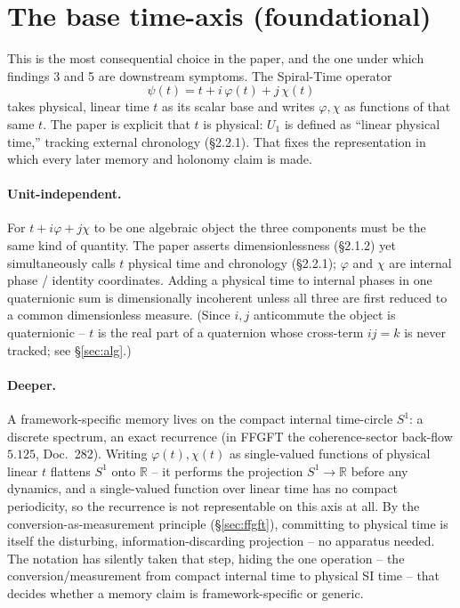 \section{The base time-axis (foundational)}
This is the most consequential choice in the paper, and the one under which findings 3
and 5 are downstream symptoms. The Spiral-Time operator
\begin{equation}
\psi(t) = t + i\,\varphi(t) + j\,\chi(t)
\end{equation}
takes physical, linear time $t$ as its scalar base and writes $\varphi,\chi$ as
functions of that same $t$. The paper is explicit that $t$ is physical: $U_1$ is defined
as ``linear physical time,'' tracking external chronology (\S2.2.1). That fixes the
representation in which every later memory and holonomy claim is made.

\paragraph{Unit-independent.} For $t + i\varphi + j\chi$ to be one algebraic object the
three components must be the same kind of quantity. The paper asserts dimensionlessness
(\S2.1.2) yet simultaneously calls $t$ physical time and chronology (\S2.2.1); $\varphi$
and $\chi$ are internal phase / identity coordinates. Adding a physical time to internal
phases in one quaternionic sum is dimensionally incoherent unless all three are first
reduced to a common dimensionless measure. (Since $i,j$ anticommute the object is
quaternionic -- $t$ is the real part of a quaternion whose cross-term $ij=k$ is never
tracked; see \S\ref{sec:alg}.)

\paragraph{Deeper.} A framework-specific memory lives on the compact internal time-circle
$S^1$: a discrete spectrum, an exact recurrence (in FFGFT the coherence-sector back-flow
$5.125$, Doc.~282). Writing $\varphi(t),\chi(t)$ as single-valued functions of physical
linear $t$ flattens $S^1$ onto $\mathbb{R}$ -- it performs the projection
$S^1\!\to\!\mathbb{R}$ before any dynamics, and a single-valued function over linear time
has no compact periodicity, so the recurrence is not representable on this axis at all.
By the conversion-as-measurement principle (\S\ref{sec:ffgft}), committing to physical
time is itself the disturbing, information-discarding projection -- no apparatus needed.
The notation has silently taken that step, hiding the one operation -- the
conversion/measurement from compact internal time to physical SI time -- that decides
whether a memory claim is framework-specific or generic.

